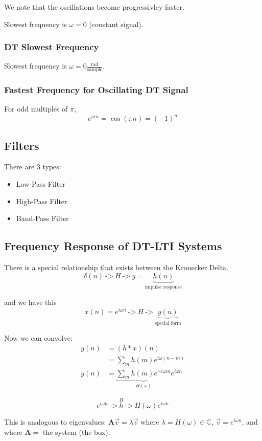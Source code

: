 We note that the oscillations become progressivley faster.

Slowest frequency is $\omega = 0$ (constant signal).

\subsubsection{DT Slowest Frequency}
Slowest frequency is $\omega = 0\frac{\text{rad}}{\text{sample}}$.

\subsubsection{Fastest Frequency for Oscillating DT Signal}
For odd multiples of $\pi$,
\[
    e^{i\pi n} = \cos(\pi n) = (-1)^n
\]

\subsection{Filters}
There are 3 types:
\begin{itemize}
    \item Low-Pass Filter
    \item High-Pass Filter
    \item Band-Pass Filter
\end{itemize}

\subsection{Frequency Response of DT-LTI Systems}
There is a special relationship that exists between the Kronecker Delta.
\[
    \delta(n) \ \texttt{->} \ \boxed{H} \ \texttt{->} \  y=\underbrace{h(n)}_\text{impulse response}
\]

and we have this
\[
    x(n) = e^{i\omega n} \ \texttt{->} \ \boxed{H} \ \texttt{->} \  \underbrace{y(n)}_\text{special form}
\]

Now we can convolve:
\begin{align*}
    y(n) &= (h\ast x)(n)
    \\
    &= \sum_m h(m)e^{i\omega(n-m)}
    \\
    y(n) &= \underbrace{\sum_m h(m) e^{-i\omega m}}_{H(\omega)} e^{i\omega n}
\end{align*}

\[
    e^{i\omega n} \ \texttt{->} \ \boxed{\stackrel H h} \ \texttt{->} \  H(\omega)e^{i\omega n}
\]

This is analogous to eigenvalues: $\mathbf A\vec v=\lambda \vec v$ where $\lambda = H(\omega)\in\mathbb C$, $\vec v = e^{i\omega n}$, and where $\mathbf A=$ the system (the box).

